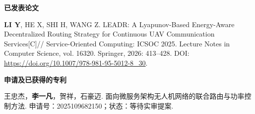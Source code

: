 \begin{publication}

\noindent\textbf{已发表论文}

\begin{enumerate}[label={[\arabic*]},leftmargin=2em]
\item \textbf{LI Y}, HE X, SHI H, WANG Z. LEADR: A Lyapunov-Based Energy-Aware Decentralized Routing Strategy for Continuous UAV Communication Services[C]// Service-Oriented Computing: ICSOC 2025. Lecture Notes in Computer Science, vol. 16320. Springer, 2026: 413--428. DOI: \url{https://doi.org/10.1007/978-981-95-5012-8_30}.
\end{enumerate}

\noindent\textbf{申请及已获得的专利}

\begin{enumerate}[label={[\arabic*]},leftmargin=2em]
\item 王忠杰，\textbf{李一凡}，贺祥，石豪迈. 面向微服务架构无人机网络的联合路由与功率控制方法. 申请号：2025109682150；状态：等待实审提案.
\end{enumerate}
\end{publication}
